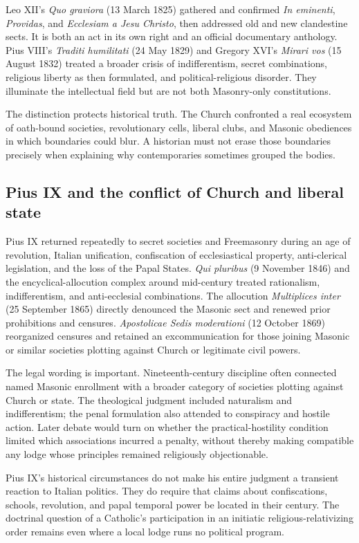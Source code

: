 Leo XII's \emph{Quo graviora} (13 March 1825) gathered and confirmed \emph{In eminenti}, \emph{Providas}, and \emph{Ecclesiam a Jesu Christo}, then addressed old and new clandestine sects. It is both an act in its own right and an official documentary anthology. Pius VIII's \emph{Traditi humilitati} (24 May 1829) and Gregory XVI's \emph{Mirari vos} (15 August 1832) treated a broader crisis of indifferentism, secret combinations, religious liberty as then formulated, and political-religious disorder. They illuminate the intellectual field but are not both Masonry-only constitutions.

The distinction protects historical truth. The Church confronted a real ecosystem of oath-bound societies, revolutionary cells, liberal clubs, and Masonic obediences in which boundaries could blur. A historian must not erase those boundaries precisely when explaining why contemporaries sometimes grouped the bodies.

\subsection{Pius IX and the conflict of Church and liberal state}

Pius IX returned repeatedly to secret societies and Freemasonry during an age of revolution, Italian unification, confiscation of ecclesiastical property, anti-clerical legislation, and the loss of the Papal States. \emph{Qui pluribus} (9 November 1846) and the encyclical-allocution complex around mid-century treated rationalism, indifferentism, and anti-ecclesial combinations. The allocution \emph{Multiplices inter} (25 September 1865) directly denounced the Masonic sect and renewed prior prohibitions and censures. \emph{Apostolicae Sedis moderationi} (12 October 1869) reorganized censures and retained an excommunication for those joining Masonic or similar societies plotting against Church or legitimate civil powers.

The legal wording is important. Nineteenth-century discipline often connected named Masonic enrollment with a broader category of societies plotting against Church or state. The theological judgment included naturalism and indifferentism; the penal formulation also attended to conspiracy and hostile action. Later debate would turn on whether the practical-hostility condition limited which associations incurred a penalty, without thereby making compatible any lodge whose principles remained religiously objectionable.

Pius IX's historical circumstances do not make his entire judgment a transient reaction to Italian politics. They do require that claims about confiscations, schools, revolution, and papal temporal power be located in their century. The doctrinal question of a Catholic's participation in an initiatic religious-relativizing order remains even where a local lodge runs no political program.

